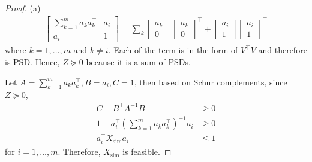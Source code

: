 \documentclass[11pt]{article}
\begin{document}
\begin{proof}
  (a)
  \begin{align*}
    \begin{bmatrix}
    \sum_{k=1}^m a_k a_k^\top & a_i \\
    a_i & 1
    \end{bmatrix}
    =
    \sum_{k}
    \begin{bmatrix}
    a_k \\
    0
    \end{bmatrix}
    \begin{bmatrix}
    a_k \\
    0
    \end{bmatrix}^\top +
    \begin{bmatrix}
        a_i \\ 1
    \end{bmatrix} 
    \begin{bmatrix}
        a_i \\ 1
    \end{bmatrix}^\top
  \end{align*}
  where $k = 1, \ldots, m$ and $k \neq i$. Each of the term is in the form of $V^\top V$ and therefore is PSD. Hence, $Z \succeq 0$ because it is a sum of PSDs. 
  
  Let $A = \sum_{k=1}^m a_k a_k^\top, B = a_i, C = 1$, then based on Schur complements, since $Z \succeq 0$, 
  \begin{align*}
      C - B^\top A^{-1} B &\geq 0 \\
      1 - a_i^\top \left( \sum_{k=1}^m a_k a_k^\top \right)^{-1} a_i &\geq 0 \\
      a_i^\top X_{\text{sim}} a_i &\leq 1
  \end{align*}
  for $i = 1, \ldots, m$. Therefore, $X_{\text{sim}}$ is feasible. 


\end{proof}
\end{document}
